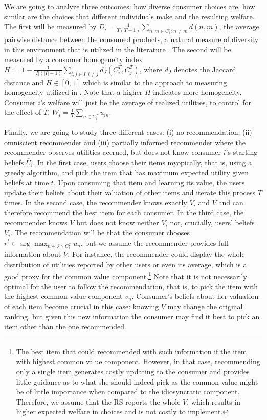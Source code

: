 \documentclass[sigconf]{acmart}
\begin{document}
We are going to analyze three outcomes: how diverse consumer choices are, how similar are the choices that different individuals make and the resulting welfare. The first will be measured by $D_i =\frac{1}{T (T-1)}\sum_{n,m \in C_i^T: n \ne m} d(n,m)$, the average pairwise distance between the consumed products, a natural measure of diversity in this environment that is utilized in the literature \cite{ziegler2005improving}. The second will be measured by a consumer homogeneity index $H:=1-\frac{1}{|I|(|I|-1)}\sum_{i,j \in I: i \ne j}d_J(C_i^T,C_j^T) $, where $d_J$ denotes the Jaccard distance and $H \in [0,1]$ which is similar to the approach to measuring homogeneity utilized in \cite{chaney2018algorithmic}. Note that a higher $H$ indicates more homogeneity. Consumer $i$'s welfare will just be the average of realized utilities, to control for the effect of $T$, $W_i=\frac{1}{T}\sum_{n \in C_i^T} u_{in}$.
\par
Finally, we are going to study three different cases: (i) no recommendation, (ii) omniscient recommender and (iii) partially informed recommender where the recommender observes utilities accrued, but does not know consumer $i$'s starting beliefs $\overline U_i$. In the first case, users choose their items myopically, that is, using a greedy algorithm, and pick the item that has maximum expected utility given beliefs at time $t$. Upon consuming that item and learning its value, the users update their beliefs about their valuation of other items and iterate this process $T$ times. In the second case, the recommender knows exactly $V_i$ and $V$ and can therefore recommend the best item for each consumer. In the third case, the recommender knows $V$ but does not know neither $V_i$ nor, crucially, users' beliefs $\overline V_i$. The recommendation will be that the consumer chooses $r^{t} \in \arg \max_{n \in \mathcal{I} \backslash C_i^T} u_n$, but we assume the recommender provides full information about $V$. For instance, the recommender could display the whole distribution of utilities reported by other users or even its average, which is a good proxy for the common value component.\footnote{
The best item that could recommended with such information if the item with highest common value component. However, in that case, recommending only a single item generates costly updating to the consumer and provides little guidance as to what she should indeed pick as the common value might be of little importance when compared to the idiosyncratic component. Therefore, we assume that the RS reports the whole $V$, which results in higher expected welfare in choices and is not costly to implement.
} Note that it is not necessarily optimal for the user to follow the recommendation, that is, to pick the item with the highest common-value component $v_n$. Consumer's beliefs about her valuation of each item become crucial in this case: knowing $V$ may change the original ranking, but given this new information the consumer may find it best to pick an item other than the one recommended.
\end{document}
